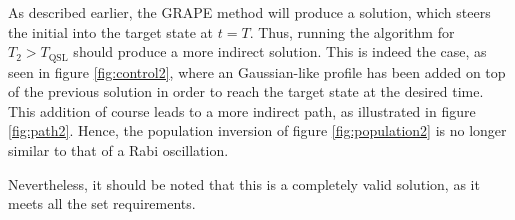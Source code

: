 As described earlier, the GRAPE method will produce a solution, which steers the initial into the target state at $t = T$. Thus, running the algorithm for $T_2 > T_{\mathrm{QSL}}$ should produce a more indirect solution.
This is indeed the case, as seen in figure \ref{fig:control2}, where an Gaussian-like profile has been added on top of the previous solution in order to reach the target state at the desired time. This addition of course leads to a more indirect path, as illustrated in figure \ref{fig:path2}. Hence, the population inversion of figure \ref{fig:population2} is no longer similar to that of a Rabi oscillation.

Nevertheless, it should be noted that this is a completely valid solution, as it meets all the set requirements.